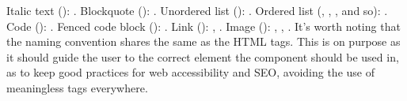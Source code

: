 \markdownRendererUlItem Italic text (): .\markdownRendererUlItemEnd 
\markdownRendererUlItem Blockquote (\markdownRendererCodeSpan{>}): .\markdownRendererUlItemEnd 
\markdownRendererUlItem Unordered list (\markdownRendererCodeSpan{-}): .\markdownRendererUlItemEnd 
\markdownRendererUlItem Ordered list (, , , and so): .\markdownRendererUlItemEnd 
\markdownRendererUlItem Code (): .\markdownRendererUlItemEnd 
\markdownRendererUlItem Fenced code block (): .\markdownRendererUlItemEnd 
\markdownRendererUlItem Link (): , .\markdownRendererUlItemEnd 
\markdownRendererUlItem Image (): , , .\markdownRendererUlItemEnd 
\markdownRendererUlEndTight \markdownRendererInterblockSeparator
{}It's worth noting that the naming convention shares the same as the HTML tags. This is on purpose as it should guide the user to the correct element the component should be used in, as to keep good practices for web accessibility and SEO, avoiding the use of meaningless  tags everywhere. \markdownRendererDocumentEnd